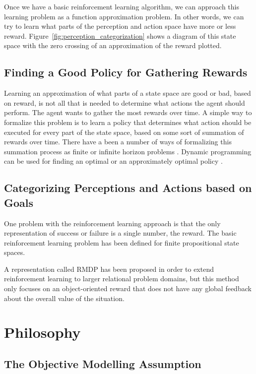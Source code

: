 Once we have a basic reinforcement learning algorithm, we can approach
this learning problem as a function approximation problem.  In other
words, we can try to learn what parts of the perception and action
space have more or less reward.
Figure~\ref{fig:perception_categorization} shows a diagram of this
state space with the zero crossing of an approximation of the reward
plotted.

\subsection{Finding a Good Policy for Gathering Rewards}

Learning an approximation of what parts of a state space are good or
bad, based on reward, is not all that is needed to determine what
actions the agent should perform.  The agent wants to gather the most
rewards over time.  A simple way to formalize this problem is to learn
a policy that determines what action should be executed for every part
of the state space, based on some sort of summation of rewards over
time.  There have a been a number of ways of formalizing this
summation process as finite or infinite horizon problems
\citep{sutton:1998}.  Dynamic programming can be used for finding an
optimal or an approximately optimal policy \citep{bertsekas:1995}.

\subsection{Categorizing Perceptions and Actions based on Goals}

One problem with the reinforcement learning approach is that the only
representation of success or failure is a single number, the reward.
The basic reinforcement learning problem has been defined for finite
propositional state spaces.

A representation called \ac{RMDP} has been proposed
\citep{guestrin:2003} in order to extend reinforcement learning to
larger relational problem domains, but this method only focuses on an
object-oriented reward that does not have any global feedback about
the overall value of the situation.


\section{Philosophy}

\subsection{The Objective Modelling Assumption}

